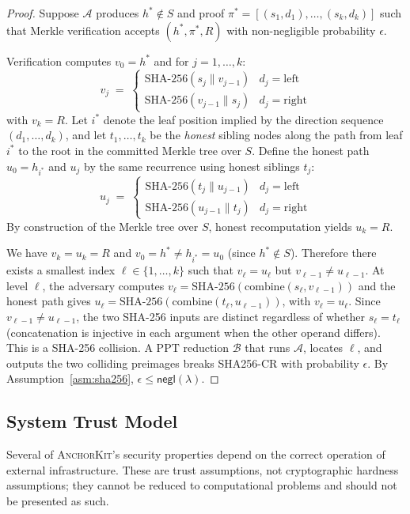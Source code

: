 \documentclass[11pt,a4paper]{article}
\newcommand{\negl}{\mathsf{negl}}
\newcommand{\ppt}{\mathrm{PPT}}
\newcommand{\calA}{\mathcal{A}}
\newcommand{\calB}{\mathcal{B}}
\newcommand{\SHA}{\text{SHA-256}}
\newcommand{\AK}{\textsc{AnchorKit}\xspace}
\begin{document}
\begin{proof}
Suppose $\calA$ produces $h^* \notin S$ and proof $\pi^* = [(s_1, d_1), \ldots,
(s_k, d_k)]$ such that Merkle verification accepts $(h^*, \pi^*, R)$ with
non-negligible probability $\epsilon$.

Verification computes $v_0 = h^*$ and for $j = 1, \ldots, k$:
\[
  v_j \;=\; \begin{cases}
    \SHA(s_j \mathbin\| v_{j-1}) & d_j = \mathrm{left} \\
    \SHA(v_{j-1} \mathbin\| s_j) & d_j = \mathrm{right}
  \end{cases}
\]
with $v_k = R$.  Let $i^*$ denote the leaf position implied by the direction
sequence $(d_1, \ldots, d_k)$, and let $t_1, \ldots, t_k$ be the \emph{honest}
sibling nodes along the path from leaf $i^*$ to the root in the committed
Merkle tree over $S$.  Define the honest path $u_0 = h_{i^*}$ and $u_j$ by the
same recurrence using honest siblings $t_j$:
\[
  u_j \;=\; \begin{cases}
    \SHA(t_j \mathbin\| u_{j-1}) & d_j = \mathrm{left} \\
    \SHA(u_{j-1} \mathbin\| t_j) & d_j = \mathrm{right}
  \end{cases}
\]
By construction of the Merkle tree over $S$, honest recomputation yields
$u_k = R$.

We have $v_k = u_k = R$ and $v_0 = h^* \neq h_{i^*} = u_0$ (since
$h^* \notin S$).  Therefore there exists a smallest index
$\ell \in \{1, \ldots, k\}$ such that $v_\ell = u_\ell$ but
$v_{\ell-1} \neq u_{\ell-1}$.  At level $\ell$, the adversary computes
$v_\ell = \SHA(\mathrm{combine}(s_\ell, v_{\ell-1}))$ and the honest path gives
$u_\ell = \SHA(\mathrm{combine}(t_\ell, u_{\ell-1}))$, with $v_\ell = u_\ell$.
Since $v_{\ell-1} \neq u_{\ell-1}$, the two SHA-256 inputs are distinct
regardless of whether $s_\ell = t_\ell$ (concatenation is injective in each
argument when the other operand differs).  This is a SHA-256 collision.  A
$\ppt$ reduction $\calB$ that runs $\calA$, locates $\ell$, and outputs the two
colliding preimages breaks SHA256-CR with probability $\epsilon$.  By
Assumption~\ref{asm:sha256}, $\epsilon \leq \negl(\lambda)$.
\end{proof}

\subsection{System Trust Model}
\label{sec:trust}

Several of \AK's security properties depend on the correct operation of
external infrastructure.  These are trust assumptions, not cryptographic
hardness assumptions; they cannot be reduced to computational problems and
should not be presented as such.
\end{document}
